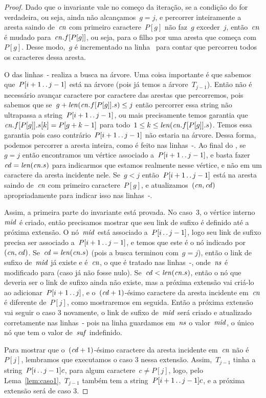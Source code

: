 \begin{proof}
Dado que o invariante vale no começo da iteração, se a condição do  for verdadeira, ou seja, ainda não alcançamos~$g=j$, e percorrer inteiramente a aresta saindo de~$\mathit{cn}$ com primeiro caractere~$P[g]$ não faz~$g$ exceder~$j$, então~$\mathit{cn}$ é mudado para~$\mathit{cn}.f[P[g]]$, ou seja, para o filho por uma aresta que começa com~$P[g]$. Desse modo,~$g$ é incrementado na linha~ para contar que percorreu todos os caracteres dessa aresta.

O  das linhas~- realiza a busca na árvore. Uma coisa importante é que sabemos que~$P[i+1\,.\,.\, j-1]$ está na árvore (pois já temos a árvore~$T_{j-1}$). Então não é necessário avançar caractere por caractere das arestas que percorremos, pois sabemos que se~$g + \mathit{len}(\mathit{cn}.f[P[g]].s) \leq j$ então percorrer essa string não ultrapassa a string~${P[i+1\,.\,.\, j-1]}$, ou mais precisamente temos garantia que~${\mathit{cn}.f[P[g]].s[k] = P[g + k - 1]}$ para todo~${1 \leq k \leq \mathit{len}(\mathit{cn}.f[P[g]].s)}$. Temos essa garantia pois caso contrário~$P[i+1\,.\,.\, j-1]$ não estaria na árvore. Dessa forma, podemos percorrer a aresta inteira, como é feito nas linhas~-. Ao final do , se~$g = j$ então encontramos um vértice associado a~$P[i+1\,.\,.\, j-1]$, e basta fazer~$\mathit{cd} = \mathit{len}(\mathit{cn}.s)$ para indicarmos que estamos realmente nesse vértice, e não em um caractere da aresta incidente nele. Se~$g < j$ então~$P[i+1\,.\,.\, j-1]$ está na aresta saindo de~$\mathit{cn}$ com primeiro caractere~$P[g]$, e atualizamos~$(\mathit{cn}, \mathit{cd})$ apropriadamente para indicar isso nas linhas~-.

Assim, a primeira parte do invariante está provada. No caso~3, o vértice interno~$\mathit{mid}$ é criado, então precisamos mostrar que seu link de sufixo é definido até a próxima extensão. O nó~$\mathit{mid}$ está associado a~$P[i\,.\,.\, j-1]$, logo seu link de sufixo precisa ser associado a~$P[i+1\,.\,.\, j-1]$, e temos que este é o nó indicado por~$(\mathit{cn}, \mathit{cd})$. Se~$\mathit{cd} = \mathit{len}(\mathit{cn}.s)$ (pois a busca terminou com~$g = j$), então o link de sufixo de~$\mathit{mid}$ já existe e é~$\mathit{cn}$, o que é tratado nas linhas~-, onde~$\mathit{ns}$ é modificado para  (caso já não fosse nulo). Se~$\mathit{cd} < \mathit{len}(\mathit{cn}.s)$, então o nó que deveria ser o link de sufixo ainda não existe, mas a próxima extensão vai criá-lo ao adicionar~$P[i+1\,.\,.\, j]$, e o~$(\mathit{cd} + 1)$-ésimo caractere da aresta incidente em~$\mathit{cn}$ é diferente de~$P[j]$, como mostraremos em seguida. Então a próxima extensão vai seguir o caso 3 novamente, o link de sufixo de~$\mathit{mid}$ será criado e atualizado corretamente nas linhas~- pois na linha  guardamos em~$\mathit{ns}$ o valor~$\mathit{mid}$, o único nó que tem o valor de~$\mathit{suf}$ indefinido.

Para mostrar que o~$(\mathit{cd}+1)$-ésimo caractere da aresta incidente em~$\mathit{cn}$ não é~$P[j]$, lembramos que executamos o caso 3 nessa extensão. Assim,~$T_{j-1}$ tinha a string~${P[i\,.\,.\, j-1] c}$, para algum caractere~$c \neq P[j]$, logo, pelo Lema~\ref{lem:caso1},~$T_{j-1}$ também tem a string~${P[i+1\,.\,.\, j-1] c}$, e a próxima extensão será de caso 3.

\end{proof}
